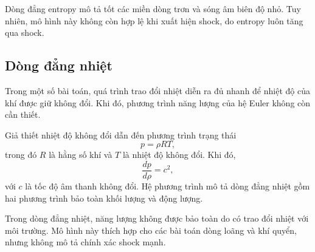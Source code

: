 Dòng đẳng entropy mô tả tốt các miền dòng trơn và sóng âm biên độ nhỏ. Tuy nhiên, mô hình này không còn hợp lệ khi xuất hiện shock, do entropy luôn tăng qua shock.

\subsection{Dòng đẳng nhiệt}

Trong một số bài toán, quá trình trao đổi nhiệt diễn ra đủ nhanh để nhiệt độ của khí được giữ không đổi. Khi đó, phương trình năng lượng của hệ Euler không còn cần thiết.

Giả thiết nhiệt độ không đổi dẫn đến phương trình trạng thái
\[
p = \rho RT,
\]
trong đó $R$ là hằng số khí và $T$ là nhiệt độ không đổi. Khi đó,
\[
\frac{dp}{d\rho} = c^2,
\]
với $c$ là tốc độ âm thanh không đổi. Hệ phương trình mô tả dòng đẳng nhiệt gồm hai phương trình bảo toàn khối lượng và động lượng.

Trong dòng đẳng nhiệt, năng lượng không được bảo toàn do có trao đổi nhiệt với môi trường. Mô hình này thích hợp cho các bài toán dòng loãng và khí quyển, nhưng không mô tả chính xác shock mạnh.

